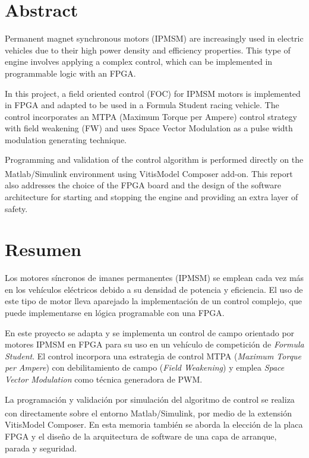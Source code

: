 \documentclass[a4paper,12pt]{article}
\begin{document}




\newpage
\section*{Abstract}
{
    Permanent magnet synchronous motors (IPMSM) are increasingly used in
    electric vehicles due to their high power density and efficiency properties.
    This type of engine involves applying a complex control, which can be
    implemented in programmable logic with an FPGA.

    In this project, a field oriented control (FOC) for IPMSM motors is
    implemented in FPGA and adapted to be used in a Formula Student racing
    vehicle. The control incorporates an MTPA (Maximum Torque per Ampere)
    control strategy with field weakening (FW) and uses Space
    Vector Modulation as a pulse width modulation generating technique.

    Programming and validation of the control algorithm is performed directly
    on the Matlab/Simulink \textsuperscript{\textregistered} environment using
    Vitis\texttrademark Model Composer add-on. This report also addresses the
    choice of the FPGA board and the design of the software architecture for
    starting and stopping the engine and providing an extra layer of safety. 
}

\newpage
\section*{Resumen}
{ 
    Los motores síncronos de imanes permanentes (IPMSM) se emplean cada vez más
    en los vehículos eléctricos debido a su densidad de potencia y eficiencia.
    El uso de este tipo de motor lleva aparejado la implementación de un
    control complejo, que puede implementarse en lógica programable con una
    FPGA.

    En este proyecto se adapta y se implementa un control de campo orientado
    por motores IPMSM en FPGA para su uso en un vehículo de competición de
    \emph{Formula Student}. El control incorpora una estrategia de control MTPA
    (\emph{Maximum Torque per Ampere}) con debilitamiento de campo (\emph{Field
    Weakening}) y emplea \emph{Space Vector Modulation} como técnica generadora
    de PWM.

    La programación y validación por simulación del algoritmo de control se
    realiza con directamente sobre el entorno
    Matlab/Simulink\textsuperscript{\textregistered}, por medio de la extensión
    Vitis\texttrademark Model Composer. En esta memoria también se aborda la
    elección de la placa FPGA y el diseño de la arquitectura de software de una
    capa de arranque, parada y seguridad. 
}
\end{document}
